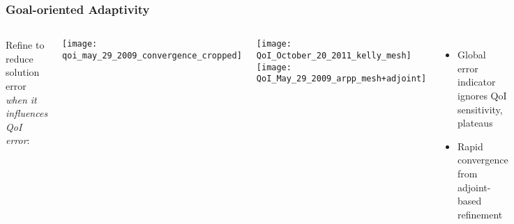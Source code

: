 \documentclass[mathserif]{beamer}
\begin{document}
\begin{frame}
\frametitle{Goal-oriented Adaptivity}

\begin{columns}

Refine to reduce solution error {\emph{when it influences QoI error}}:

\begin{center}
\texttt{[image: qoi\_may\_29\_2009\_convergence\_cropped]}
\end{center}


\begin{center}
\texttt{[image: QoI\_October\_20\_2011\_kelly\_mesh]}
\texttt{[image: QoI\_May\_29\_2009\_arpp\_mesh+adjoint]}
\end{center}

\begin{itemize}
\item Global error indicator ignores QoI sensitivity, plateaus
\item Rapid convergence from adjoint-based refinement
\end{itemize}

\end{columns}

\end{frame}
\end{document}
